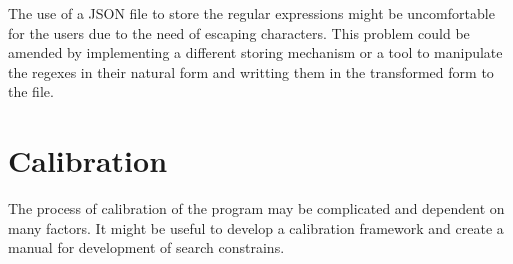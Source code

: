 \documentclass[a4paper,twoside,12pt]{book}
\newcounter{PagesWithoutNumbers}
\begin{document}
The use of a JSON file to store the regular expressions might be uncomfortable for the users due to the need of escaping characters. 
This problem could be amended by implementing a different storing mechanism or a tool to manipulate the regexes in their natural form 
and writting them in the transformed form to the file. 

\section{Calibration}

The process of calibration of the program may be complicated and dependent on many factors. It might be 
useful to develop a calibration framework and create a manual for development of search constrains.



 

 


\backmatter
{}
\setcounter{page}{\value{PagesWithoutNumbers}}

\pagestyle{onlyPageNumbers}




\end{document}
